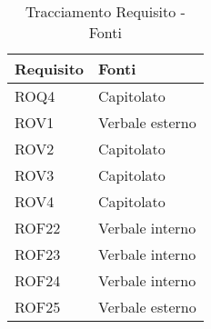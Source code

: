 \newpage
\begin{table}[h!]
    \centering
    \renewcommand{\arraystretch}{1.6} %
    \begin{tabularx}{0.8\textwidth}{|>{\centering\arraybackslash}p{2.8cm}|>{\centering\arraybackslash}X|} \hline
    \rowcolor[HTML]{FFD700} 
    \textbf{Requisito} & \textbf{Fonti} \\ \hline
    ROQ4 & Capitolato \\ \hline
    ROV1 & Verbale esterno\\ \hline
    ROV2 & Capitolato\\ \hline
    ROV3 & Capitolato\\ \hline
    ROV4 & Capitolato\\ \hline
    ROF22 & Verbale interno\\ \hline
    ROF23 & Verbale interno\\ \hline
    ROF24 & Verbale interno\\ \hline
    ROF25 & Verbale esterno\\ \hline

    \end{tabularx}
    \caption{Tracciamento Requisito - Fonti}
    \label{tab:Tracciamento_requisiti_fonti}
\end{table}